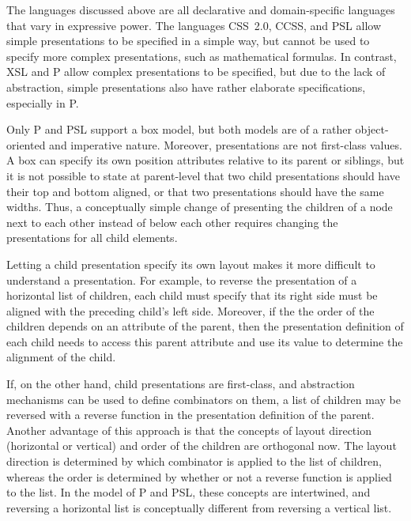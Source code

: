 
The languages discussed above are all declarative and domain-specific languages that vary in expressive power. The languages CSS~2.0, CCSS, and PSL allow simple presentations to be specified in a simple way, but cannot be used to specify more complex presentations, such as mathematical formulas. In contrast, XSL and P allow complex presentations to be specified, but due to the lack of abstraction, simple presentations also have rather elaborate specifications, especially in P. 

Only P and PSL support a box model, but both models are of a rather object-oriented and imperative nature. Moreover, presentations are not first-class values. A box can specify its own position attributes relative to its parent or siblings, but it is not possible to state at parent-level that two child presentations should have their top and bottom aligned, or that two presentations should have the same widths. \bc Thus, a conceptually simple change of presenting the children of a node next to each other instead of below each other requires changing the presentations for all child elements.\ec 

Letting a child presentation specify its own layout makes it more difficult to understand a presentation. For example, to reverse the presentation of a horizontal list of children, each child must specify that its right side must be aligned with the preceding child's left side. Moreover, if the the order of the children depends on an attribute of the parent, then the presentation definition of each child needs to access this parent attribute and use its value to determine the alignment of the child.

If, on the other hand, child presentations are first-class, and abstraction mechanisms can be used to define combinators on them, a list of children may be reversed with a reverse function in the presentation definition of the parent.  Another advantage of this approach is that the concepts of layout direction (horizontal or vertical) and order of the children are orthogonal now. The layout direction is determined by which combinator is applied to the list of children, whereas the order is determined by whether or not a reverse function is applied to the list. In the model of P and PSL, these concepts are intertwined, and reversing a horizontal list is conceptually different from reversing a vertical list.


